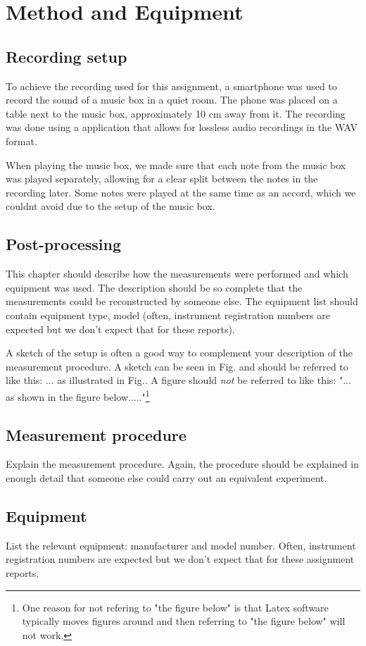 \chapter{Method and Equipment}

\section{Recording setup}

To achieve the recording used for this assignment, a smartphone was used to record the sound of a music box in a quiet room. The phone was placed on a table next to the music box, approximately 10 cm away from it. The recording was done using a application that allows for lossless audio recordings in the WAV format. 

When playing the music box, we made sure that each note from the music box was played separately, allowing for a clear split between the notes in the recording later. Some notes were played at the same time as an accord, which we couldnt avoid due to the setup of the music box. 

\section{Post-processing}


This chapter should describe how the measurements were performed and which equipment was used. The description should be so complete that the measurements could be reconstructed by someone else. The equipment list should contain equipment type, model (often, instrument registration numbers are expected but we don't expect that for these reports). 

A sketch of the setup is often a good way to complement your description of the measurement procedure. A sketch can be seen in Fig.  and should be referred to like this: ... as illustrated in Fig.. A figure should {\em not} be referred to like this: "... as shown in the figure below....."\footnote{One reason for not refering to "the figure below" is that Latex software typically moves figures around and then referring to "the figure below" will not work.}


\section{\label{sec:Measurement-procedure}Measurement procedure}
Explain the measurement procedure. Again, the procedure should be explained in enough detail that someone else could carry out an equivalent experiment.

\section{Equipment}
List the relevant equipment: manufacturer and model number. Often, instrument registration numbers are expected but we don't expect that for these assignment reports.

